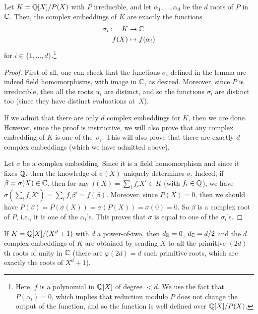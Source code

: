\begin{lemma}
Let $K = \mathbb{Q}[X]/P(X)$ with $P$ irreducible, and let $\alpha_1, \dots, \alpha_d$ be the $d$ roots of $P$ in~$\mathbb{C}$. Then, the complex embeddings of $K$ are exactly the functions
\begin{align*}
\sigma_i: \ \ \ K & \rightarrow \mathbb{C} \\
                f(X) & \mapsto f(\alpha_i)
\end{align*}
for $i \in \{1, \dots, d\}$.\footnote{Here, $f$ is a polynomial in $\mathbb{Q}[X]$ of degree $< d$. We use the fact that $P(\alpha_i) = 0$, which implies that reduction modulo $P$ does not change the output of the function, and so the function is well defined over $\mathbb{Q}[X]/P(X)$.}
\end{lemma}

\begin{proof}
First of all, one can check that the functions $\sigma_i$ defined in the lemma are indeed field homomorphisms, with image in $\mathbb{C}$, as desired. Moreover, since $P$ is irreducible, then all the roots $\alpha_i$ are distinct, and so the functions $\sigma_i$ are distinct too (since they have distinct evaluations at~$X$).

If we admit that there are only $d$ complex embeddings for $K$, then we are done. However, since the proof is instructive, we will also prove that any complex embedding of $K$ is one of the~$\sigma_i$. This will also prove that there are exactly $d$ complex embeddings (which we have admitted above).

Let $\sigma$ be a complex embedding. Since it is a field homomorphism and since it fixes $\mathbb{Q}$, then the knowledge of $\sigma(X)$ uniquely determines $\sigma$. Indeed, if $\beta = \sigma(X) \in \mathbb{C}$, then for any $f(X) = \sum_i f_i X^i \in K$ (with $f_i \in \mathbb{Q}$), we have $\sigma(\sum_i f_i X^i) = \sum_i f_i \beta^i = f(\beta)$.
Moreover, since $P(X) = 0$, then we should have $P(\beta) = P(\sigma(X)) = \sigma(P(X)) = \sigma(0) = 0$. So $\beta$ is a complex root of $P$, i.e., it is one of the $\alpha_i$'s. This proves that $\sigma$ is equal to one of the $\sigma_i$'s.
\end{proof}

\begin{example}
If $K = \mathbb{Q}[X]/(X^d+1)$ with $d$ a power-of-two, then $d_{\mathbb{R}} = 0$, $d_{\mathbb{C}} = d/2$ and the $d$ complex embeddings of $K$ are obtained by sending $X$ to all the primitive $(2d)$-th roots of unity in $\mathbb{C}$ (there are $\varphi(2d) = d$ such primitive roots, which are exactly the roots of $X^d+1$).
\end{example}

